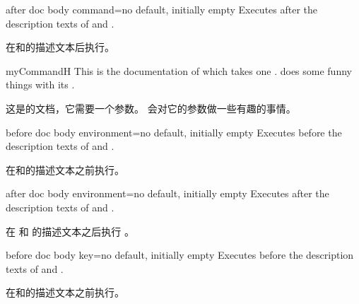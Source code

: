 \begin{docTcbKey}[][doc new=2015-10-09]{after doc body command}{=}{no default, initially empty}
Executes  after the description texts
of  and .

在和的描述文本后执行。
\begin{dispExample}

\begin{docCommand*}{myCommandH}{}
This is the documentation of  which takes one .
 does some funny things with its .

这是的文档，它需要一个参数。 会对它的参数做一些有趣的事情。
\end{docCommand*}
\end{dispExample}
\end{docTcbKey}


\begin{docTcbKey}[][doc new=2015-10-09]{before doc body environment}{=}{no default, initially empty}
Executes  before the description texts
of  and .

在和的描述文本之前执行。
\end{docTcbKey}

\begin{docTcbKey}[][doc new=2015-10-09]{after doc body environment}{=}{no default, initially empty}
Executes  after the description texts
of  and .

在  和  的描述文本之后执行 。
\end{docTcbKey}


\begin{docTcbKey}[][doc new=2015-10-09]{before doc body key}{=}{no default, initially empty}
Executes  before the description texts
of  and .

在和的描述文本之前执行。
\end{docTcbKey}

